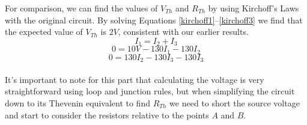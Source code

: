\documentclass[11pt]{article}
\begin{document}
    For comparison, we can find the values of \(V_{Th}\) and \(R_{Th}\) by using Kirchoff's Laws with the original circuit. By solving Equations \ref{kirchoff1}--\ref{kirchoff3} we find that the expected value of \(V_{Th}\) is \(2 V\), consistent with our earlier results. \\
    
    \begin{equation}
        \label{kirchoff1}
        I_1 = I_2 + I_3
    \end{equation}
    \begin{equation}
        \label{kirchoff2}
        0 = 10V - 130 I_1 - 130 I_2       
    \end{equation}
    \begin{equation}
        \label{kirchoff3}
        0 = 130 I_2 - 130 I_3 - 130 I_3        
    \end{equation} \\

    It's important to note for this part that calculating the voltage is very straightforward using loop and junction rules, but when simplifying the circuit down to its Thevenin equivalent to find \(R_{Th}\) we need to short the source voltage and start to consider the resistors relative to the points \(A\) and \(B\). \\



\end{document}
